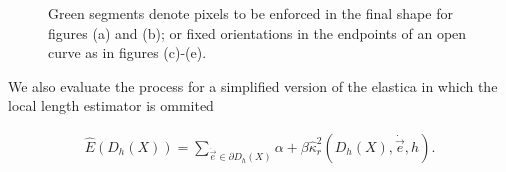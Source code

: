 \begin{figure}[h!]
{}\hspace{1em}%
\hspace{1em}%
\hspace{1em}%

\caption{Green segments denote pixels to be enforced in the final shape for figures (a) and (b); or fixed orientations in the endpoints of an open curve as in figures (c)-(e). }
\label{fig:fixed-pixels-evolution}
\end{figure}

We also evaluate the process for a simplified version of the elastica in which the local length estimator is ommited

	\begin{align}
	\hat{E}( D_h(X) ) = \sum_{\dot{\vec{e}} \in \partial D_h(X)}{ \alpha + \beta \hat{\kappa}_{r}^2(D_h(X),\dot{\vec{e}},h) }.
	\label{eq:simplified-digital-elastica}
	\end{align}
	

